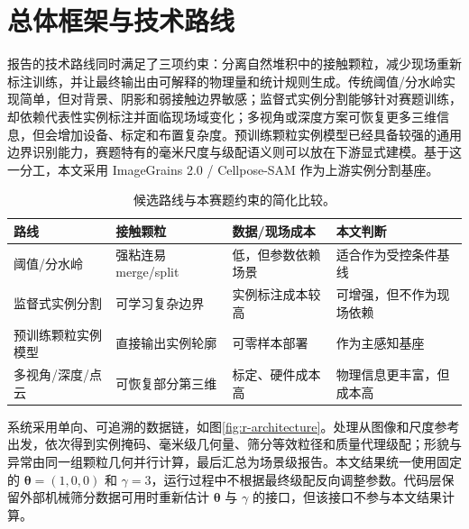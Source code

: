 \section{总体框架与技术路线}
\label{sec:r-framework}

报告的技术路线同时满足了三项约束：分离自然堆积中的接触颗粒，减少现场重新标注训练，并让最终输出由可解释的物理量和统计规则生成。传统阈值/分水岭实现简单，但对背景、阴影和弱接触边界敏感；监督式实例分割能够针对赛题训练，却依赖代表性实例标注并面临现场域变化；多视角或深度方案可恢复更多三维信息，但会增加设备、标定和布置复杂度。预训练颗粒实例模型已经具备较强的通用边界识别能力，赛题特有的毫米尺度与级配语义则可以放在下游显式建模。基于这一分工，本文采用 ImageGrains 2.0 / Cellpose-SAM 作为上游实例分割基座\cite{stringer2021cellpose,pachitariu2025cellposeSAM,mair2026imagegrains2}。

\begin{table}[t]
\centering
\caption{候选路线与本赛题约束的简化比较。}
\label{tab:r-route}
\footnotesize
\renewcommand{\arraystretch}{1.12}
\begin{tabular}{>{\raggedright\arraybackslash}p{3.1cm}>{\raggedright\arraybackslash}p{3.1cm}>{\raggedright\arraybackslash}p{3.0cm}>{\raggedright\arraybackslash}p{4.1cm}}
\toprule
路线 & 接触颗粒 & 数据/现场成本 & 本文判断 \\
\midrule
阈值/分水岭 & 强粘连易 merge/split & 低，但参数依赖场景 & 适合作为受控条件基线 \\
监督式实例分割 & 可学习复杂边界 & 实例标注成本较高 & 可增强，但不作为现场依赖 \\
预训练颗粒实例模型 & 直接输出实例轮廓 & 可零样本部署 & 作为主感知基座 \\
多视角/深度/点云 & 可恢复部分第三维 & 标定、硬件成本高 & 物理信息更丰富，但成本高 \\
\bottomrule
\end{tabular}
\end{table}

系统采用单向、可追溯的数据链，如图\ref{fig:r-architecture}。处理从图像和尺度参考出发，依次得到实例掩码、毫米级几何量、筛分等效粒径和质量代理级配；形貌与异常由同一组颗粒几何并行计算，最后汇总为场景级报告。本文结果统一使用固定的 $\boldsymbol{\theta}=(1,0,0)$ 和 $\gamma=3$，运行过程中不根据最终级配反向调整参数。代码层保留外部机械筛分数据可用时重新估计 $\boldsymbol{\theta}$ 与 $\gamma$ 的接口，但该接口不参与本文结果计算。


